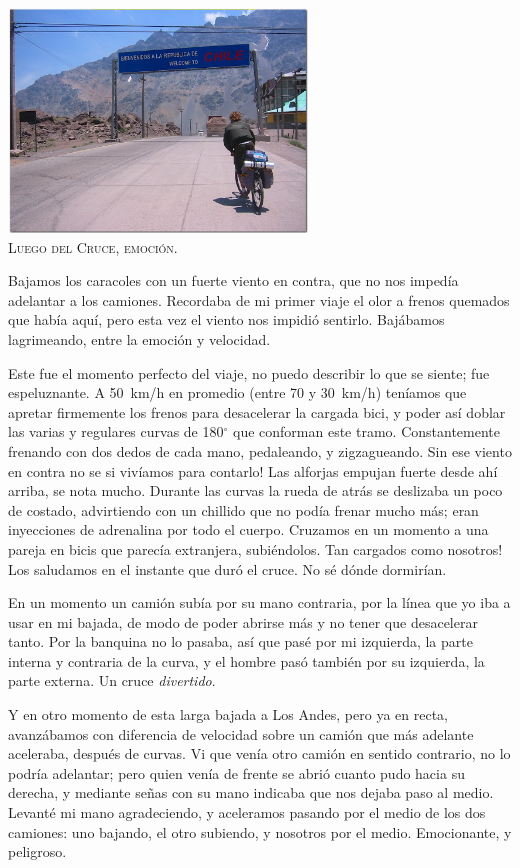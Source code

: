 \begin{center} \includegraphics[width=300px]{images/Mendoza_0370.jpg}\\
\textsc{Luego del Cruce, emoci\'on.} \end{center}

Bajamos los caracoles con un fuerte viento en contra, que no nos imped\'ia
adelantar a los camiones. Recordaba de mi primer viaje el olor a frenos quemados
que hab\'ia aqu\'i, pero esta vez el viento nos impidi\'o sentirlo. Baj\'abamos
lagrimeando, entre la emoci\'on y velocidad.

Este fue el momento perfecto del viaje, no puedo describir lo que se siente; fue
espeluznante. A 50~km/h en promedio (entre 70 y 30~km/h) ten\'iamos que apretar
firmemente los frenos para desacelerar la cargada bici, y poder as\'i doblar las
varias y regulares curvas de 180$^\circ$ que conforman este tramo.
Constantemente frenando con dos dedos de cada mano, pedaleando, y zigzagueando.
\textexclamdown Sin ese viento en contra no se si viv\'iamos para contarlo! Las
alforjas empujan fuerte desde ah\'i arriba, se nota mucho. Durante las curvas la
rueda de atr\'as se deslizaba un poco de costado, advirtiendo con un chillido
que no pod\'ia frenar mucho m\'as; eran inyecciones de adrenalina por todo el
cuerpo. Cruzamos en un momento a una pareja en bicis que parec\'ia extranjera,
subi\'endolos. \textexclamdown Tan cargados como nosotros! Los saludamos en el
instante que dur\'o el cruce. No s\'e d\'onde dormir\'ian.

En un momento un cami\'on sub\'ia por su mano contraria, por la l\'inea que yo
iba a usar en mi bajada, de modo de poder abrirse m\'as y no tener que
desacelerar tanto. Por la banquina no lo pasaba, as\'i que pas\'e por mi
izquierda, la parte interna y contraria de la curva, y el hombre pas\'o
tambi\'en por su izquierda, la parte externa. Un cruce \emph{divertido}.

Y en otro momento de esta larga bajada a Los Andes, pero ya en recta,
avanz\'abamos con diferencia de velocidad sobre un cami\'on que m\'as adelante
aceleraba, despu\'es de curvas. Vi que ven\'ia otro cami\'on en sentido
contrario, no lo podr\'ia adelantar; pero quien ven\'ia de frente se abri\'o
cuanto pudo hacia su derecha, y mediante se\~nas con su mano indicaba que nos
dejaba paso al medio. Levant\'e mi mano agradeciendo, y aceleramos pasando por
el medio de los dos camiones: uno bajando, el otro subiendo, y nosotros por el
medio. Emocionante, y peligroso.

